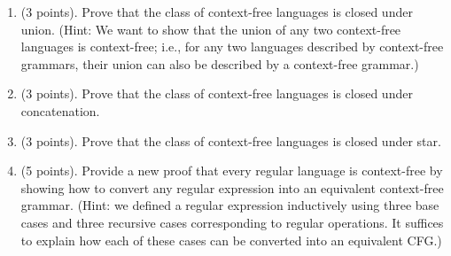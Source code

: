 \documentclass[letterpaper,11pt,twoside]{article}
\theoremstyle{plain}
\theoremstyle{definition}
\theoremstyle{remark}
\theoremstyle{restate}
\begin{document}
\begin{enumerate}
    \item (3 points). Prove that the class of context-free languages is closed under union. (Hint: We want to show that the union of any two context-free languages is context-free; i.e., for any two languages described by context-free grammars, their union can also be described by a context-free grammar.)
    
    \item (3 points). Prove that the class of context-free languages is closed under concatenation.
    
    \item (3 points). Prove that the class of context-free languages is closed under star.
    
    \item (5 points). Provide a new proof that every regular language is context-free by showing how to convert any regular expression into an equivalent context-free grammar. (Hint: we defined a regular expression inductively using three base cases and three recursive cases corresponding to regular operations. It suffices to explain how each of these cases can be converted into an equivalent CFG.)
\end{enumerate}
\end{document}
